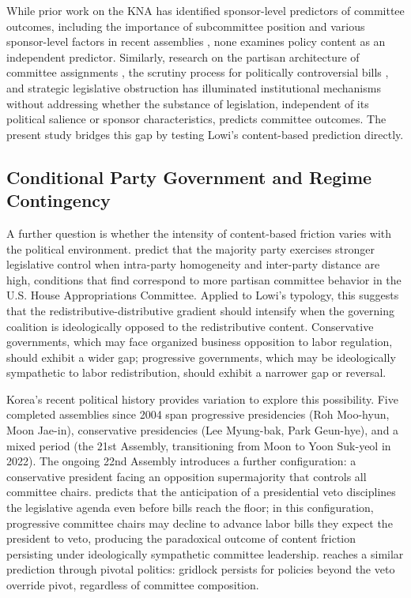 \documentclass[11pt]{article}
\begin{document}
While prior work on the KNA has identified sponsor-level predictors of committee outcomes, including the importance of subcommittee position \citep{kim2023} and various sponsor-level factors in recent assemblies \citep{an2025}, none examines policy content as an independent predictor. Similarly, research on the partisan architecture of committee assignments \citep{choi2018}, the scrutiny process for politically controversial bills \citep{seo2020}, and strategic legislative obstruction \citep{jeong2024} has illuminated institutional mechanisms without addressing whether the substance of legislation, independent of its political salience or sponsor characteristics, predicts committee outcomes. The present study bridges this gap by testing Lowi's content-based prediction directly.

\subsection{Conditional Party Government and Regime Contingency}
\label{sec:lit-cpg}

A further question is whether the intensity of content-based friction varies with the political environment. \citet{aldrich2001} predict that the majority party exercises stronger legislative control when intra-party homogeneity and inter-party distance are high, conditions that \citet{aldrich2012} find correspond to more partisan committee behavior in the U.S. House Appropriations Committee. Applied to Lowi's typology, this suggests that the redistributive-distributive gradient should intensify when the governing coalition is ideologically opposed to the redistributive content. Conservative governments, which may face organized business opposition to labor regulation, should exhibit a wider gap; progressive governments, which may be ideologically sympathetic to labor redistribution, should exhibit a narrower gap or reversal.

Korea's recent political history provides variation to explore this possibility. Five completed assemblies since 2004 span progressive presidencies (Roh Moo-hyun, Moon Jae-in), conservative presidencies (Lee Myung-bak, Park Geun-hye), and a mixed period (the 21st Assembly, transitioning from Moon to Yoon Suk-yeol in 2022). The ongoing 22nd Assembly introduces a further configuration: a conservative president facing an opposition supermajority that controls all committee chairs. \citet{cameron2000} predicts that the anticipation of a presidential veto disciplines the legislative agenda even before bills reach the floor; in this configuration, progressive committee chairs may decline to advance labor bills they expect the president to veto, producing the paradoxical outcome of content friction persisting under ideologically sympathetic committee leadership. \citet{krehbiel1998} reaches a similar prediction through pivotal politics: gridlock persists for policies beyond the veto override pivot, regardless of committee composition.
\end{document}
